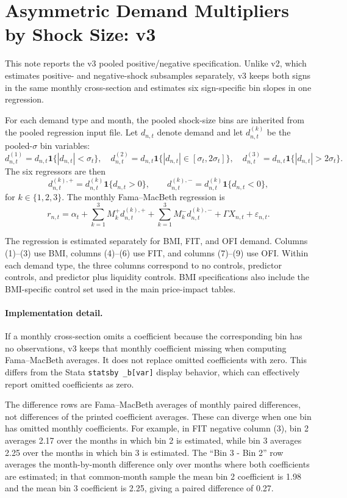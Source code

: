 \documentclass[11pt]{article}
\begin{document}
\section*{Asymmetric Demand Multipliers by Shock Size: v3}

This note reports the v3 pooled positive/negative specification. Unlike v2,
which estimates positive- and negative-shock subsamples separately, v3 keeps
both signs in the same monthly cross-section and estimates six sign-specific
bin slopes in one regression.

For each demand type and month, the pooled shock-size bins are inherited from
the pooled regression input file. Let $d_{n,t}$ denote demand and let
$d^{(k)}_{n,t}$ be the pooled-$\sigma$ bin variables:
\[
d^{(1)}_{n,t} = d_{n,t}\mathbf{1}\{|d_{n,t}| < \sigma_t\}, \quad
d^{(2)}_{n,t} = d_{n,t}\mathbf{1}\{|d_{n,t}| \in [\sigma_t,2\sigma_t]\}, \quad
d^{(3)}_{n,t} = d_{n,t}\mathbf{1}\{|d_{n,t}| > 2\sigma_t\}.
\]
The six regressors are then
\[
d^{(k),+}_{n,t} = d^{(k)}_{n,t}\mathbf{1}\{d_{n,t} > 0\}, \qquad
d^{(k),-}_{n,t} = d^{(k)}_{n,t}\mathbf{1}\{d_{n,t} < 0\},
\]
for $k \in \{1,2,3\}$. The monthly Fama--MacBeth regression is
\[
r_{n,t} = \alpha_t
        + \sum_{k=1}^3 M_k^+ d^{(k),+}_{n,t}
        + \sum_{k=1}^3 M_k^- d^{(k),-}_{n,t}
        + \Gamma X_{n,t} + \varepsilon_{n,t}.
\]

The regression is estimated separately for BMI, FIT, and OFI demand. Columns
(1)--(3) use BMI, columns (4)--(6) use FIT, and columns (7)--(9) use OFI.
Within each demand type, the three columns correspond to no controls,
predictor controls, and predictor plus liquidity controls. BMI specifications
also include the BMI-specific control set used in the main price-impact tables.

\paragraph{Implementation detail.}
If a monthly cross-section omits a coefficient because the corresponding bin
has no observations, v3 keeps that monthly coefficient missing when computing
Fama--MacBeth averages. It does not replace omitted coefficients with zero.
This differs from the Stata \texttt{statsby \_b[var]} display behavior, which
can effectively report omitted coefficients as zero.

The difference rows are Fama--MacBeth averages of monthly paired differences,
not differences of the printed coefficient averages. These can diverge when
one bin has omitted monthly coefficients. For example, in FIT negative column
(3), bin 2 averages 2.17 over the months in which bin 2 is estimated, while
bin 3 averages 2.25 over the months in which bin 3 is estimated. The
``Bin 3 - Bin 2'' row averages the month-by-month difference only over months
where both coefficients are estimated; in that common-month sample the mean
bin 2 coefficient is 1.98 and the mean bin 3 coefficient is 2.25, giving a
paired difference of 0.27.
\end{document}
